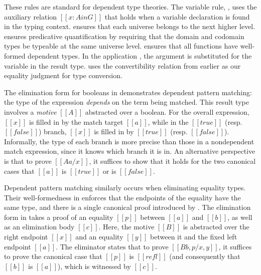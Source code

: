 \documentclass[\ifpublic nolinenum\else\fi,online,OA]{jfp}
\newcommand{\scw}[1]{}
\theoremstyle{definition}
\begin{document}
These rules are standard for dependent
type theories.  The variable rule, , uses the auxiliary relation
$[[x : A in G]]$ that holds when a variable declaration is found in the
typing context.  ensures that each universe belongs to the
next higher level.  ensures predicative quantification by
requiring that the domain and codomain types be typeable at the same universe
level.  ensures that all functions have well-formed dependent
types. In the application , the argument is substituted for the
variable in the result type.
 uses the convertibility relation from earlier
as our equality judgment for type conversion.

\scw{Cassia did not follow our discussion of dependent pattern matching. We need to expand}
The elimination form for booleans in  demonstrates dependent pattern
matching: the type of the expression \emph{depends} on the term being matched.
This result type involves a \emph{motive} $[[A]]$ abstracted over a boolean.
For the overall expression, $[[x]]$ is filled in by the match target $[[a]]$,
while in the $[[true]]$ (resp. $[[false]]$) branch, $[[x]]$ is filled in by
$[[true]]$ (resp. $[[false]]$). Informally, the type of each branch is more
precise than those in a nondependent match expression, since it knows which
branch it is in. An alternative perspective is that to prove $[[A {a/x}]]$, it
suffices to show that it holds for the two canonical cases that $[[a]]$ is
$[[true]]$ or is $[[false]]$.


Dependent pattern matching similarly occurs when eliminating equality types.
Their well-formedness in  enforces that the endpoints of the
equality have the same type, and there is a single canonical proof introduced
by . The elimination form in  takes a proof of an
equality $[[p]]$ between $[[a]]$ and $[[b]]$, as well as an elimination body
$[[c]]$. Here, the motive $[[B]]$ is abstracted over the right endpoint $[[x]]$
and an equality $[[y]]$ between it and the fixed left endpoint $[[a]]$. The
eliminator states that to prove $[[B{b, p / x, y}]]$, it suffices to prove the
canonical case that $[[p]]$ is $[[refl]]$ (and consequently that $[[b]]$ is
$[[a]]$), which is witnessed by $[[c]]$.
\end{document}
